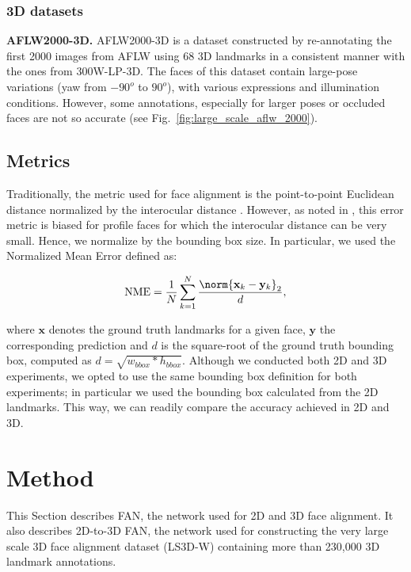 	\subsubsection{3D datasets}

	\textbf{AFLW2000-3D.} AFLW2000-3D \cite{zhu2016face} is a dataset constructed by re-annotating the first 2000 images from AFLW \cite{kostinger2011annotated} using 68 3D landmarks in a consistent manner with the ones from 300W-LP-3D. The faces of this dataset contain large-pose variations (yaw from $-90^o$ to $90^o$), with various expressions and illumination conditions. However, some annotations, especially for larger poses or occluded faces are not so accurate (see Fig.~\ref{fig:large_scale_aflw_2000}). 

	\subsection{Metrics} 

	Traditionally, the metric used for face alignment is the point-to-point Euclidean distance normalized by the interocular distance  \cite{cristinacce2006feature, sagonas2013300, shen2015first}. However, as noted in \cite{zhu2012face}, this error metric is biased for profile faces for which the interocular distance can be very small. Hence, we normalize by the bounding box size. In particular, we used the Normalized Mean Error defined as:

\begin{equation}
	\textrm{NME} = \frac{1}{N} \sum_{k=1}^{N} \frac{\norm{ \mathbf{x}_k-\mathbf{y}_{k} }_{2} }{d}, \label{eq:additive0}
	\end{equation}

	 where $\mathbf{x}$ denotes the ground truth landmarks for a given face, $\mathbf{y}$ the corresponding prediction and $d$ is the square-root of the ground truth bounding box, computed as $d = \sqrt{w_{bbox}*h_{bbox}}$. Although we conducted both 2D and 3D experiments, we opted to use the same bounding box definition for both experiments; in particular we used the bounding box calculated from the 2D landmarks. This way, we can readily compare the accuracy achieved in 2D and 3D. 

	\section{Method}
	This Section describes FAN, the network used for 2D and 3D face alignment. It also describes 2D-to-3D FAN, the network used for constructing the very large scale 3D face alignment dataset (LS3D-W) containing more than 230,000 3D landmark annotations.

